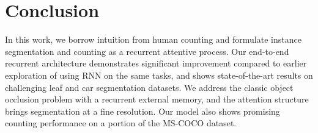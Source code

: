 \section{Conclusion}

In this work, we borrow intuition from human counting and formulate instance
segmentation and counting as a recurrent attentive process. Our end-to-end
recurrent architecture demonstrates significant improvement compared to earlier
exploration of using RNN on the same tasks, and shows state-of-the-art results
on challenging leaf and car segmentation datasets. We address the classic
object occlusion problem with a recurrent external memory, and the attention
structure brings segmentation at a fine resolution. Our model also shows
promising counting performance on a portion of the MS-COCO dataset.
